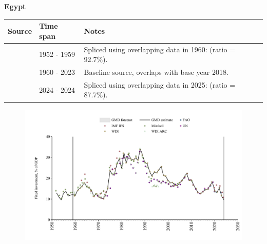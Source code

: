 \documentclass[12pt,a4paper,landscape]{article}
\begin{document}
\begin{adjustbox}{max totalsize={\paperwidth}{\paperheight},center}
\begin{minipage}[t][\textheight][t]{\textwidth}
\vspace*{0.5cm}
{}
\begin{center}
{\Large\bfseries Egypt}
\end{center}
\vspace{0.5cm}
\begin{table}[H]
\centering
\small
\begin{tabular}{|l|l|l|}
\hline
\textbf{Source} & \textbf{Time span} & \textbf{Notes} \\
\hline
\rowcolor{white}\cite{Mitchell}& 1952 - 1959 &Spliced using overlapping data in 1960: (ratio = 92.7\%).\\
\rowcolor{lightgray}\cite{WDI}& 1960 - 2023 &Baseline source, overlaps with base year 2018.\\
\rowcolor{white}\cite{IMF_IFS}& 2024 - 2024 &Spliced using overlapping data in 2025: (ratio = 87.7\%).\\
\hline
\end{tabular}
\end{table}
\begin{figure}[H]
\centering
\includegraphics[width=\textwidth,height=0.6\textheight,keepaspectratio]{graphs/EGY_finv_GDP.pdf}
\end{figure}
\end{minipage}
\end{adjustbox}
\end{document}
